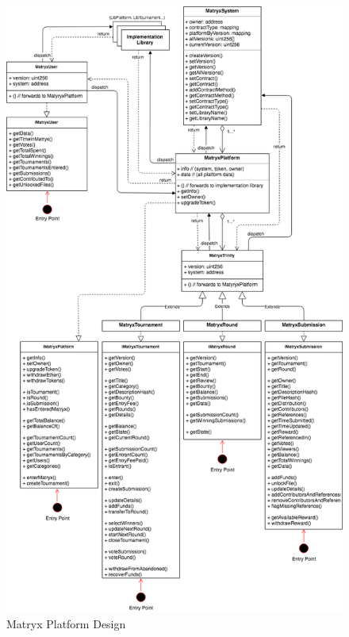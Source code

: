 \documentclass[a4paper, 10pt, conference]{ieeeconf}      %
\begin{document}
\printbibliography

\begin{figure}
\caption{Matryx Platform Design}
\label{Platformdesign}
\centering
\includegraphics[scale = .5]{../Figures/MatryxArchitecture2018-MatryxPlatform.png}
\end{figure}
\end{document}
